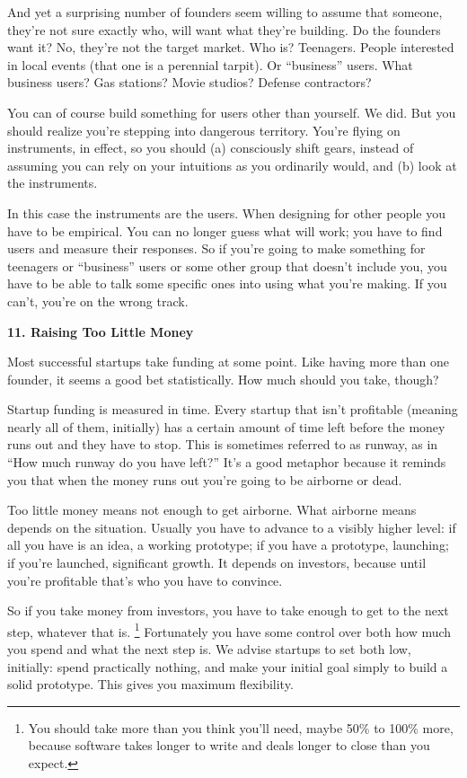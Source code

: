 And yet a surprising number of founders seem willing to assume that
someone, they're not sure exactly who, will want what they're building.
Do the founders want it? No, they're not the target market. Who is?
Teenagers. People interested in local events (that one is a perennial
tarpit). Or ``business'' users. What business users? Gas stations? Movie
studios? Defense contractors?

You can of course build something for users other than yourself. We did.
But you should realize you're stepping into dangerous territory. You're
flying on instruments, in effect, so you should (a) consciously shift
gears, instead of assuming you can rely on your intuitions as you
ordinarily would, and (b) look at the instruments.

In this case the instruments are the users. When designing for other
people you have to be empirical. You can no longer guess what will work;
you have to find users and measure their responses. So if you're going
to make something for teenagers or ``business'' users or some other
group that doesn't include you, you have to be able to talk some
specific ones into using what you're making. If you can't, you're on the
wrong track.

\textbf{11. Raising Too Little Money}

Most successful startups take funding at some point. Like having more
than one founder, it seems a good bet statistically. How much should you
take, though?

Startup funding is measured in time. Every startup that isn't profitable
(meaning nearly all of them, initially) has a certain amount of time
left before the money runs out and they have to stop. This is sometimes
referred to as runway, as in ``How much runway do you have left?'' It's
a good metaphor because it reminds you that when the money runs out
you're going to be airborne or dead.

Too little money means not enough to get airborne. What airborne means
depends on the situation. Usually you have to advance to a visibly
higher level: if all you have is an idea, a working prototype; if you
have a prototype, launching; if you're launched, significant growth. It
depends on investors, because until you're profitable that's who you
have to convince.

So if you take money from investors, you have to take enough to get to
the next step, whatever that is. \footnote{You should take more than you think you'll need, maybe 50\% to
100\% more, because software takes longer to write and deals longer to
close than you expect.} Fortunately you
have some control over both how much you spend and what the next step
is. We advise startups to set both low, initially: spend practically
nothing, and make your initial goal simply to build a solid prototype.
This gives you maximum flexibility.

